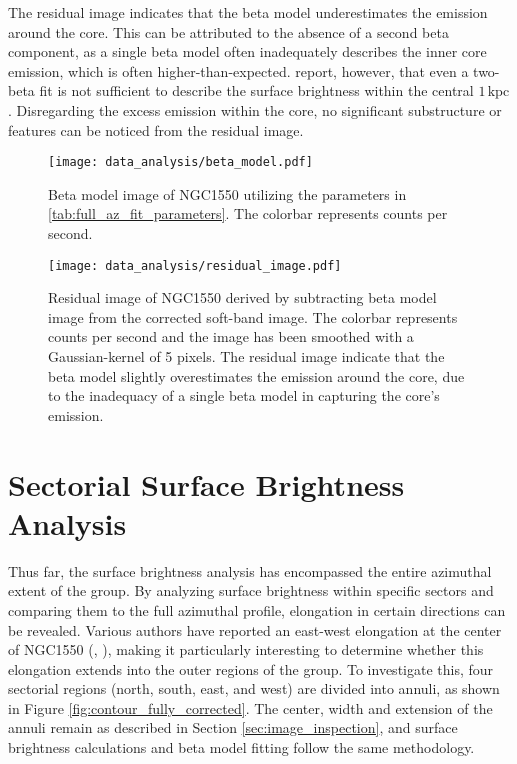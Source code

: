 The residual image indicates that the beta model underestimates the emission around the core. This can be attributed to the absence of a second beta component, as a single beta model often inadequately describes the inner core emission, which is often higher-than-expected. \cite{Sun_2003} report, however, that even a two-beta fit is not sufficient to describe the surface brightness within the central \(1\,\text{kpc}\). Disregarding the excess emission within the core, no significant substructure or features can be noticed from the residual image.
\begin{figure}[htbp]
    \centering
    \texttt{[image: data\_analysis/beta\_model.pdf]}
    \caption{Beta model image of NGC1550 utilizing the parameters in \ref{tab:full_az_fit_parameters}. The colorbar represents counts per second.}
    \label{fig:beta_model}
\end{figure}
\begin{figure}[htbp]
    \centering
    \texttt{[image: data\_analysis/residual\_image.pdf]}
    \caption{Residual image of NGC1550 derived by subtracting beta model image from the corrected soft-band image. The colorbar represents counts per second and the image has been smoothed with a Gaussian-kernel of 5 pixels. The residual image indicate that the beta model slightly overestimates the emission around the core, due to the inadequacy of a single beta model in capturing the core's emission.}
    \label{fig:residual_image}
\end{figure}
\section{Sectorial Surface Brightness Analysis}
Thus far, the surface brightness analysis has encompassed the entire azimuthal extent of the group. By analyzing surface brightness within specific sectors and comparing them to the full azimuthal profile, elongation in certain directions can be revealed. Various authors have reported an east-west elongation at the center of NGC1550 (\cite{Sun_2003}, \cite{Kolokythas_2020}), making it particularly interesting to determine whether this elongation extends into the outer regions of the group. To investigate this, four sectorial regions (north, south, east, and west) are divided into annuli, as shown in Figure \ref{fig:contour_fully_corrected}. The center, width and extension of the annuli remain as described in Section \ref{sec:image_inspection}, and surface brightness calculations and beta model fitting follow the same methodology.

